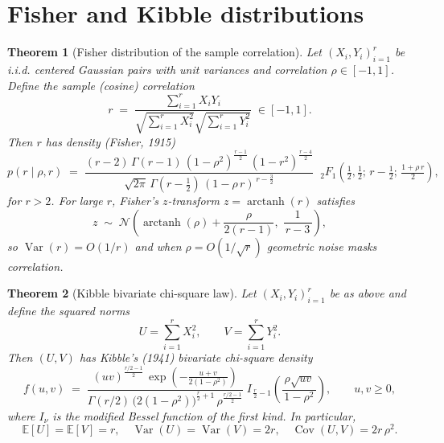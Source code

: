 \documentclass{article}
\newtheorem{theorem}{Theorem}
\begin{document}
\section{Fisher and Kibble distributions}
\begin{theorem}[Fisher distribution of the sample correlation]
Let $(X_i,Y_i)_{i=1}^r$ be i.i.d. centered Gaussian pairs with unit variances and correlation $\rho\in[-1,1]$. Define the sample (cosine) correlation
\[
r \;=\; \frac{\sum_{i=1}^r X_iY_i}{\sqrt{\sum_{i=1}^r X_i^2}\sqrt{\sum_{i=1}^r Y_i^2}} \;\in [-1,1].
\]
Then $r$ has density (Fisher, 1915)
\[
p(r\mid \rho,r) \;=\; \frac{(r-2)\,\Gamma(r-1)\,(1-\rho^2)^{\frac{r-1}{2}}\,(1-r^2)^{\frac{r-4}{2}}}{\sqrt{2\pi}\,\Gamma\!\left(r-\tfrac{1}{2}\right)\,(1-\rho\,r)^{\,r-\frac{3}{2}}}\;\;{}_2F_1\!\left(\tfrac{1}{2},\tfrac{1}{2};\, r-\tfrac{1}{2};\, \tfrac{1+\rho\,r}{2}\right),
\]
for $r>2$. For large $r$, Fisher's $z$-transform $z=\operatorname{arctanh}(r)$ satisfies
\[
z \;\sim\; \mathcal{N}\!\left(\operatorname{arctanh}(\rho)+\frac{\rho}{2(r-1)},\;\frac{1}{\,r-3\,}\right),
\]
so $\operatorname{Var}(r)=O(1/r)$ and when $\rho=O(1/\sqrt{r})$ geometric noise masks correlation.
\end{theorem}

\begin{theorem}[Kibble bivariate chi-square law]
Let $(X_i,Y_i)_{i=1}^r$ be as above and define the squared norms
\[
U=\sum_{i=1}^r X_i^2,\qquad V=\sum_{i=1}^r Y_i^2.
\]
Then $(U,V)$ has Kibble's (1941) bivariate chi-square density
\[
f(u,v) \;=\; \frac{(uv)^{\frac{r/2-1}{2}}\,\exp\!\left(-\tfrac{u+v}{2(1-\rho^2)}\right)}{\Gamma(r/2)\,\big(2(1-\rho^2)\big)^{\frac{r}{2}+1}\,\rho^{\frac{r/2-1}{2}}}\; I_{\,\frac{r}{2}-1}\!\left(\frac{\rho\sqrt{uv}}{\,1-\rho^2\,}\right),\qquad u,v\ge 0,
\]
where $I_\nu$ is the modified Bessel function of the first kind. In particular,
\[
\mathbb{E}[U]=\mathbb{E}[V]=r,\quad \operatorname{Var}(U)=\operatorname{Var}(V)=2r,\quad \operatorname{Cov}(U,V)=2r\,\rho^2.
\]
\end{theorem}



\end{document}
